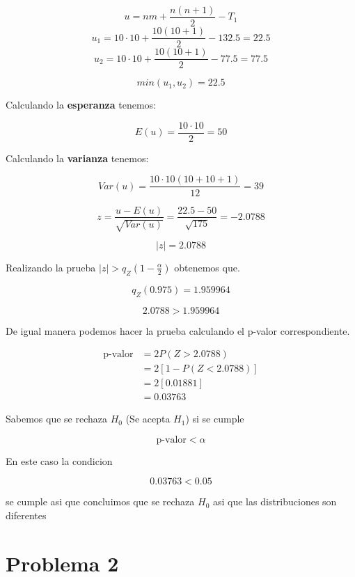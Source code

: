 \documentclass{article}
\begin{document}
\[u = nm + \frac{n(n+1)}{2} - T_1\]
\[u_1 = 10 \cdot 10 + \frac{10(10+1)}{2} - 132.5 = 22.5\]
\[u_2 = 10 \cdot 10 + \frac{10(10+1)}{2} - 77.5 = 77.5\]

\[min(u_1, u_2) = 22.5\]

Calculando la \textbf{esperanza} tenemos:

\[E(u) = \frac{10 \cdot 10}{2} = 50\]

Calculando la \textbf{varianza} tenemos:

\[Var(u) = \frac{10 \cdot 10(10+10+1)}{12} = 39\]

\[z = \frac{u - E(u)}{\sqrt{Var(u)}} = \frac{22.5 - 50}{\sqrt{175}} = -2.0788\]

\[|z| = 2.0788\]

Realizando la prueba \( |z| > q_Z \left(1 - \frac{\alpha}{2} \right) \) obtenemos que.

\[
    q_Z (0.975) = 1.959964
\]

\[
    2.0788 > 1.959964
\]

De igual manera podemos hacer la prueba calculando el p-valor correspondiente.

\begin{align*}
    \text{p-valor} &= 2P(Z > 2.0788) \\
    &= 2 \left[1 - P(Z < 2.0788)\right] \\
    &= 2 \left[0.01881\right] \\
    &= 0.03763
\end{align*}

Sabemos que se rechaza $H_0$ (Se acepta $H_1$) si se cumple

\[\text{p-valor} < \alpha\]

\vspace*{.25cm}

En este caso la condicion 

\[0.03763 < 0.05\]

se cumple asi que concluimos que se rechaza $H_0$ asi que las distribuciones son diferentes

\section{Problema 2}
\end{document}
